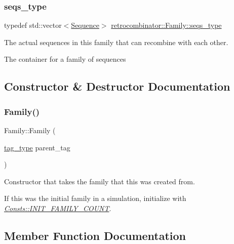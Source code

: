 \subsubsection{\texorpdfstring{seqs\+\_\+type}{seqs\_type}}
{\footnotesize\ttfamily typedef std\+::vector$<$\hyperlink{classretrocombinator_1_1Sequence}{Sequence}$>$ \hyperlink{classretrocombinator_1_1Family_a994b8646d1c0c4e19420d2e5c6c53c85}{retrocombinator\+::\+Family\+::seqs\+\_\+type}}



The actual sequences in this family that can recombine with each other. 

The container for a family of sequences 

\subsection{Constructor \& Destructor Documentation}
\mbox{\label{classretrocombinator_1_1Family_aefb8619ac695a3ad8e654ed8302668ee}} 
\subsubsection{\texorpdfstring{Family()}{Family()}}
{\footnotesize\ttfamily Family\+::\+Family (\begin{DoxyParamCaption}\item[{\hyperlink{constants_8h_afd7c6eb4293e8c4d12827609a9a34b9b}{tag\+\_\+type}}]{parent\+\_\+tag }\end{DoxyParamCaption})}



Constructor that takes the family that this was created from. 

If this was the initial family in a simulation, initialize with {\itshape \hyperlink{namespaceretrocombinator_1_1Consts_af4adf5f1b75ede326285e110e2acf837}{Consts\+::\+I\+N\+I\+T\+\_\+\+F\+A\+M\+I\+L\+Y\+\_\+\+C\+O\+U\+NT}}. 

\subsection{Member Function Documentation}
\mbox{\label{classretrocombinator_1_1Family_a79b180c88225ee52d21da020375d2dfd}} 
